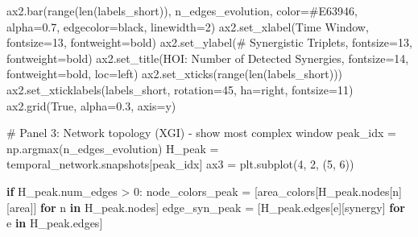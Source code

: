 \documentclass[
  11pt,
  letterpaper,
  oneside,
  openany]{book}
\newenvironment{Shaded}{\begin{snugshade}}{\end{snugshade}}
\newcommand{\BuiltInTok}[1]{\textcolor[rgb]{0.00,0.23,0.31}{#1}}
\newcommand{\CommentTok}[1]{\textcolor[rgb]{0.37,0.37,0.37}{#1}}
\newcommand{\ControlFlowTok}[1]{\textcolor[rgb]{0.00,0.23,0.31}{\textbf{#1}}}
\newcommand{\DecValTok}[1]{\textcolor[rgb]{0.68,0.00,0.00}{#1}}
\newcommand{\FloatTok}[1]{\textcolor[rgb]{0.68,0.00,0.00}{#1}}
\newcommand{\KeywordTok}[1]{\textcolor[rgb]{0.00,0.23,0.31}{\textbf{#1}}}
\newcommand{\NormalTok}[1]{\textcolor[rgb]{0.00,0.23,0.31}{#1}}
\newcommand{\OperatorTok}[1]{\textcolor[rgb]{0.37,0.37,0.37}{#1}}
\newcommand{\StringTok}[1]{\textcolor[rgb]{0.13,0.47,0.30}{#1}}
\newcommand{\VariableTok}[1]{\textcolor[rgb]{0.07,0.07,0.07}{#1}}
\begin{document}
\begin{Shaded}
\begin{Highlighting}[]
\NormalTok{ax2.bar(}\BuiltInTok{range}\NormalTok{(}\BuiltInTok{len}\NormalTok{(labels\_short)), n\_edges\_evolution, }
\NormalTok{       color}\OperatorTok{=}\StringTok{\textquotesingle{}\#E63946\textquotesingle{}}\NormalTok{, alpha}\OperatorTok{=}\FloatTok{0.7}\NormalTok{, edgecolor}\OperatorTok{=}\StringTok{\textquotesingle{}black\textquotesingle{}}\NormalTok{, linewidth}\OperatorTok{=}\DecValTok{2}\NormalTok{)}
\NormalTok{ax2.set\_xlabel(}\StringTok{\textquotesingle{}Time Window\textquotesingle{}}\NormalTok{, fontsize}\OperatorTok{=}\DecValTok{13}\NormalTok{, fontweight}\OperatorTok{=}\StringTok{\textquotesingle{}bold\textquotesingle{}}\NormalTok{)}
\NormalTok{ax2.set\_ylabel(}\StringTok{\textquotesingle{}\# Synergistic Triplets\textquotesingle{}}\NormalTok{, fontsize}\OperatorTok{=}\DecValTok{13}\NormalTok{, fontweight}\OperatorTok{=}\StringTok{\textquotesingle{}bold\textquotesingle{}}\NormalTok{)}
\NormalTok{ax2.set\_title(}\StringTok{\textquotesingle{}HOI: Number of Detected Synergies\textquotesingle{}}\NormalTok{, }
\NormalTok{             fontsize}\OperatorTok{=}\DecValTok{14}\NormalTok{, fontweight}\OperatorTok{=}\StringTok{\textquotesingle{}bold\textquotesingle{}}\NormalTok{, loc}\OperatorTok{=}\StringTok{\textquotesingle{}left\textquotesingle{}}\NormalTok{)}
\NormalTok{ax2.set\_xticks(}\BuiltInTok{range}\NormalTok{(}\BuiltInTok{len}\NormalTok{(labels\_short)))}
\NormalTok{ax2.set\_xticklabels(labels\_short, rotation}\OperatorTok{=}\DecValTok{45}\NormalTok{, ha}\OperatorTok{=}\StringTok{\textquotesingle{}right\textquotesingle{}}\NormalTok{, fontsize}\OperatorTok{=}\DecValTok{11}\NormalTok{)}
\NormalTok{ax2.grid(}\VariableTok{True}\NormalTok{, alpha}\OperatorTok{=}\FloatTok{0.3}\NormalTok{, axis}\OperatorTok{=}\StringTok{\textquotesingle{}y\textquotesingle{}}\NormalTok{)}

\CommentTok{\# Panel 3: Network topology (XGI) {-} show most complex window}
\NormalTok{peak\_idx }\OperatorTok{=}\NormalTok{ np.argmax(n\_edges\_evolution)}
\NormalTok{H\_peak }\OperatorTok{=}\NormalTok{ temporal\_network.snapshots[peak\_idx]}
\NormalTok{ax3 }\OperatorTok{=}\NormalTok{ plt.subplot(}\DecValTok{4}\NormalTok{, }\DecValTok{2}\NormalTok{, (}\DecValTok{5}\NormalTok{, }\DecValTok{6}\NormalTok{))}

\ControlFlowTok{if}\NormalTok{ H\_peak.num\_edges }\OperatorTok{\textgreater{}} \DecValTok{0}\NormalTok{:}
\NormalTok{    node\_colors\_peak }\OperatorTok{=}\NormalTok{ [area\_colors[H\_peak.nodes[n][}\StringTok{\textquotesingle{}area\textquotesingle{}}\NormalTok{]] }\ControlFlowTok{for}\NormalTok{ n }\KeywordTok{in}\NormalTok{ H\_peak.nodes]}
\NormalTok{    edge\_syn\_peak }\OperatorTok{=}\NormalTok{ [H\_peak.edges[e][}\StringTok{\textquotesingle{}synergy\textquotesingle{}}\NormalTok{] }\ControlFlowTok{for}\NormalTok{ e }\KeywordTok{in}\NormalTok{ H\_peak.edges]}
    

\end{Highlighting}
\end{Shaded}
\end{document}
